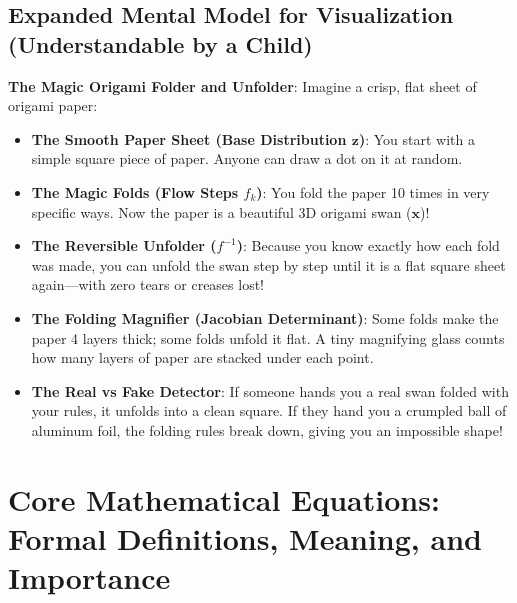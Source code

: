 \documentclass[11pt,a4paper]{article}
\theoremstyle{definition}
\begin{document}
\subsection{Expanded Mental Model for Visualization (Understandable by a Child)}
\textbf{The Magic Origami Folder and Unfolder}:
Imagine a crisp, flat sheet of origami paper:
\begin{itemize}
    \item \textbf{The Smooth Paper Sheet (Base Distribution $\mathbf{z}$)}:
    You start with a simple square piece of paper. Anyone can draw a dot on it at random.
    
    \item \textbf{The Magic Folds (Flow Steps $f_k$)}:
    You fold the paper 10 times in very specific ways. Now the paper is a beautiful 3D origami swan ($\mathbf{x}$)!
    
    \item \textbf{The Reversible Unfolder ($f^{-1}$)}:
    Because you know exactly how each fold was made, you can unfold the swan step by step until it is a flat square sheet again—with zero tears or creases lost!
    
    \item \textbf{The Folding Magnifier (Jacobian Determinant)}:
    Some folds make the paper 4 layers thick; some folds unfold it flat. A tiny magnifying glass counts how many layers of paper are stacked under each point.
    
    \item \textbf{The Real vs Fake Detector}:
    If someone hands you a real swan folded with your rules, it unfolds into a clean square. If they hand you a crumpled ball of aluminum foil, the folding rules break down, giving you an impossible shape!
\end{itemize}

\section{Core Mathematical Equations: Formal Definitions, Meaning, and Importance}
\end{document}

